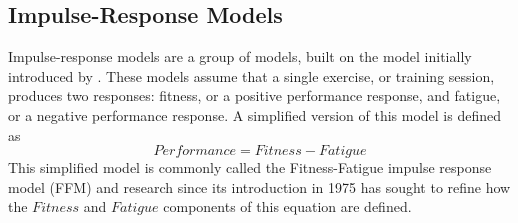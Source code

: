 \subsection{Impulse-Response Models} 
Impulse-response models are a group of models, built on the model initially introduced by \textcite{Bannister1976}. These models assume that a single exercise, or training session, produces two responses: fitness, or a positive performance response, and fatigue, or a negative performance response. A simplified version of this model is defined as 
\begin{equation}\label{eq:ffm}
  Performance = Fitness - Fatigue
\end{equation}
This simplified model is commonly called the Fitness-Fatigue impulse response model (FFM) and research since its introduction in 1975 has sought to refine how the $Fitness$ and $Fatigue$ components of this equation are defined.

